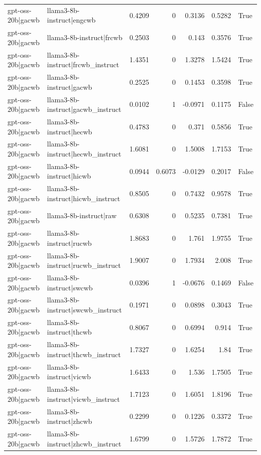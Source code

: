 \begin{table}
\begin{tabular}{l l r r r r l}
gpt-oss-20b|gacwb & llama3-8b-instruct|engcwb & 0.4209 & 0 & 0.3136 & 0.5282 & True \\
gpt-oss-20b|gacwb & llama3-8b-instruct|frcwb & 0.2503 & 0 & 0.143 & 0.3576 & True \\
gpt-oss-20b|gacwb & llama3-8b-instruct|frcwb_instruct & 1.4351 & 0 & 1.3278 & 1.5424 & True \\
gpt-oss-20b|gacwb & llama3-8b-instruct|gacwb & 0.2525 & 0 & 0.1453 & 0.3598 & True \\
gpt-oss-20b|gacwb & llama3-8b-instruct|gacwb_instruct & 0.0102 & 1 & -0.0971 & 0.1175 & False \\
gpt-oss-20b|gacwb & llama3-8b-instruct|hecwb & 0.4783 & 0 & 0.371 & 0.5856 & True \\
gpt-oss-20b|gacwb & llama3-8b-instruct|hecwb_instruct & 1.6081 & 0 & 1.5008 & 1.7153 & True \\
gpt-oss-20b|gacwb & llama3-8b-instruct|hicwb & 0.0944 & 0.6073 & -0.0129 & 0.2017 & False \\
gpt-oss-20b|gacwb & llama3-8b-instruct|hicwb_instruct & 0.8505 & 0 & 0.7432 & 0.9578 & True \\
gpt-oss-20b|gacwb & llama3-8b-instruct|raw & 0.6308 & 0 & 0.5235 & 0.7381 & True \\
gpt-oss-20b|gacwb & llama3-8b-instruct|rucwb & 1.8683 & 0 & 1.761 & 1.9755 & True \\
gpt-oss-20b|gacwb & llama3-8b-instruct|rucwb_instruct & 1.9007 & 0 & 1.7934 & 2.008 & True \\
gpt-oss-20b|gacwb & llama3-8b-instruct|swcwb & 0.0396 & 1 & -0.0676 & 0.1469 & False \\
gpt-oss-20b|gacwb & llama3-8b-instruct|swcwb_instruct & 0.1971 & 0 & 0.0898 & 0.3043 & True \\
gpt-oss-20b|gacwb & llama3-8b-instruct|thcwb & 0.8067 & 0 & 0.6994 & 0.914 & True \\
gpt-oss-20b|gacwb & llama3-8b-instruct|thcwb_instruct & 1.7327 & 0 & 1.6254 & 1.84 & True \\
gpt-oss-20b|gacwb & llama3-8b-instruct|vicwb & 1.6433 & 0 & 1.536 & 1.7505 & True \\
gpt-oss-20b|gacwb & llama3-8b-instruct|vicwb_instruct & 1.7123 & 0 & 1.6051 & 1.8196 & True \\
gpt-oss-20b|gacwb & llama3-8b-instruct|zhcwb & 0.2299 & 0 & 0.1226 & 0.3372 & True \\
gpt-oss-20b|gacwb & llama3-8b-instruct|zhcwb_instruct & 1.6799 & 0 & 1.5726 & 1.7872 & True \\

\end{tabular}
\end{table}

